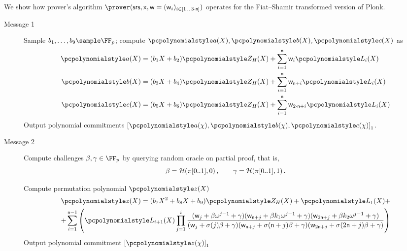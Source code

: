  We show how prover's algorithm
$\prover(\srs, \inp, \wit = (\wit_i)_{i \in \range{1}{3 \cdot \noofc}})$ operates for
the Fiat--Shamir transformed version of Plonk.
\begin{description}
\item[Message 1] Sample $b_1, \ldots, b_9 \sample \FF_p$; compute
  $\p{a}(X), \p{b}(X), \p{c}(X)$ as
	\begin{align*}
		\p{a}(X) &= (b_1 X + b_2)\p{Z_H}(X) + \sum_{i = 1}^{\noofc} \wit_i \lag_i(X) \\
		\p{b}(X) &= (b_3 X + b_4)\p{Z_H}(X) + \sum_{i = 1}^{\noofc} \wit_{\noofc + i} \lag_i(X) \\
		\p{c}(X) &= (b_5 X + b_6)\p{Z_H}(X) + \sum_{i = 1}^{\noofc} \wit_{2 \cdot \noofc + i} \lag_i(X) 
	\end{align*}
	Output polynomial commitments $\gone{\p{a}(\chi), \p{b}(\chi), \p{c}(\chi)}$.  
	
\item[Message 2] Compute challenges $\beta, \gamma \in \FF_p$ by querying random oracle
  on partial proof, that is,
	\[
		\beta = \mathcal{H}(\pi[0..1], 0)\,, \qquad \gamma = \mathcal{H}(\pi[0..1], 1)\,.
	\]
  
	Compute permutation polynomial $\p{z}(X)$
	\begin{multline*}
		\p{z}(X) = (b_7 X^2 + b_8 X + b_9)\p{Z_H}(X) + \lag_1(X) + \\
    + \sum_{i = 1}^{\noofc - 1} \left(\lag_{i + 1} (X) \prod_{j = 1}^{i} \frac{
        (\wit_j +\beta \omega^{j - 1} + \gamma)(\wit_{\noofc + j} + \beta k_1
        \omega^{j - 1} + \gamma)(\wit_{2 \noofc + j} +\beta k_2 \omega^{j- 1} +
        \gamma)} {(\wit_j+\sigma(j) \beta + \gamma)(\wit_{\noofc + j} + \sigma(\noofc
        + j)\beta + \gamma)(\wit_{2 \noofc + j} + \sigma(2 \noofc + j)\beta +
        \gamma)}\right)
	\end{multline*}
	Output polynomial commitment $\gone{\p{z}(\chi)}$
		

\end{description}
